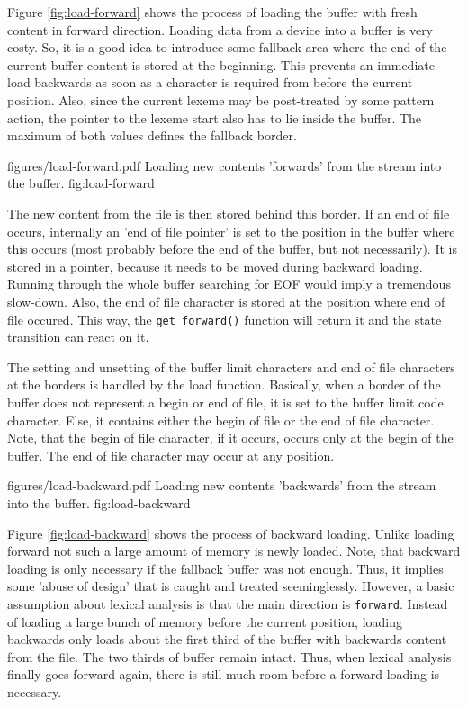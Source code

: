 Figure \ref{fig:load-forward} shows the process of loading the buffer with fresh content in forward direction.
Loading data from a device into a buffer is very costy. So, it is a good idea to introduce
some fallback area where the end of the current buffer content is stored at the beginning.
This prevents an immediate load backwards as soon as a character is required from before the
current position. Also, since the current lexeme may be post-treated by some pattern action,
the pointer to the lexeme start also has to lie inside the buffer. The maximum of both values defines the 
fallback border. 
	
\showpic
{figures/load-forward.pdf}
{Loading new contents 'forwards' from the stream into the buffer.}
{fig:load-forward}

The new content from the file is then stored behind this border. If an
end of file occurs, internally an 'end of file pointer' is set to the position in the
buffer where this occurs (most probably before the end of the buffer, but not necessarily).
It is stored in a pointer, because it needs to be moved during backward loading. Running through the
whole buffer searching for EOF would imply a tremendous slow-down.
Also, the end of file character is stored at the position where end of
file occured. This way, the {\tt get\_forward()} function will return
it and the state transition can react on it.

The setting and unsetting of the buffer limit characters and end of
file characters at the borders is handled by the load function. Basically, when a border
of the buffer does not represent a begin or end of file, it is set to the buffer limit code character.
Else, it contains either the begin of file or the end of file character. Note, that the
begin of file character, if it occurs, occurs only at the begin of the buffer. The
end of file character may occur at any position.

\showpic
{figures/load-backward.pdf}
{Loading new contents 'backwards' from the stream into the buffer.}
{fig:load-backward}

Figure \ref{fig:load-backward} shows the process of backward loading. Unlike loading forward not such a large amount
of memory is newly loaded. Note, that backward loading is only necessary if the fallback buffer
was not enough. Thus, it implies some 'abuse of design' that is caught and treated seeminglessly.
However, a basic assumption about lexical analysis is that the main direction is {\tt forward\/}.
Instead of loading a large bunch of memory before the current position, loading backwards only
loads about the first third of the buffer with backwards content from the file. The two thirds
of buffer remain intact. Thus, when lexical analysis finally goes forward again, there is still
much room before a forward loading is necessary.


